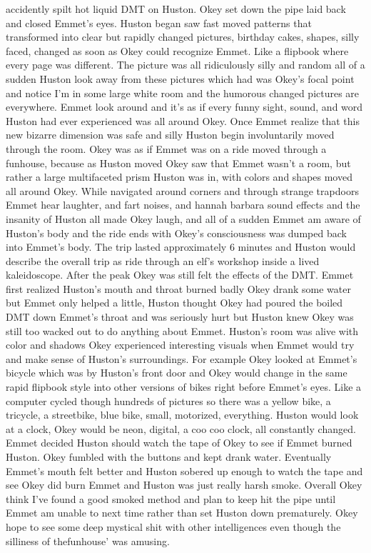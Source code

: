 \documentclass[12pt]{book}
\begin{document}
accidently spilt hot liquid DMT on Huston. Okey set down the pipe laid back and closed Emmet's eyes. Huston began saw fast moved patterns that transformed into clear but rapidly changed pictures, birthday cakes, shapes, silly faced, changed as soon as Okey could recognize Emmet. Like a flipbook where every page was different. The picture was all ridiculously silly and random all of a sudden Huston look away from these pictures which had was Okey's focal point and notice I'm in some large white room and the humorous changed pictures are everywhere. Emmet look around and it's as if every funny sight, sound, and word Huston had ever experienced was all around Okey. Once Emmet realize that this new bizarre dimension was safe and silly Huston begin involuntarily moved through the room. Okey was as if Emmet was on a ride moved through a funhouse, because as Huston moved Okey saw that Emmet wasn't a room, but rather a large multifaceted prism Huston was in, with colors and shapes moved all around Okey. While navigated around corners and through strange trapdoors Emmet hear laughter, and fart noises, and hannah barbara sound effects and the insanity of Huston all made Okey laugh, and all of a sudden Emmet am aware of Huston's body and the ride ends with Okey's consciousness was dumped back into Emmet's body. The trip lasted approximately 6 minutes and Huston would describe the overall trip as ride through an elf's workshop inside a lived kaleidoscope. After the peak Okey was still felt the effects of the DMT. Emmet first realized Huston's mouth and throat burned badly Okey drank some water but Emmet only helped a little, Huston thought Okey had poured the boiled DMT down Emmet's throat and was seriously hurt but Huston knew Okey was still too wacked out to do anything about Emmet. Huston's room was alive with color and shadows Okey experienced interesting visuals when Emmet would try and make sense of Huston's surroundings. For example Okey looked at Emmet's bicycle which was by Huston's front door and Okey would change in the same rapid flipbook style into other versions of bikes right before Emmet's eyes. Like a computer cycled though hundreds of pictures so there was a yellow bike, a tricycle, a streetbike, blue bike, small, motorized, everything. Huston would look at a clock, Okey would be neon, digital, a coo coo clock, all constantly changed. Emmet decided Huston should watch the tape of Okey to see if Emmet burned Huston. Okey fumbled with the buttons and kept drank water. Eventually Emmet's mouth felt better and Huston sobered up enough to watch the tape and see Okey did burn Emmet and Huston was just really harsh smoke. Overall Okey think I've found a good smoked method and plan to keep hit the pipe until Emmet am unable to next time rather than set Huston down prematurely. Okey hope to see some deep mystical shit with other intelligences even though the silliness of thefunhouse' was amusing.
\end{document}
